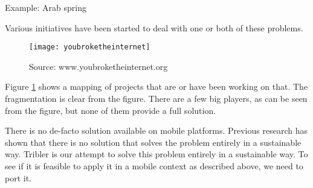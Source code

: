 Example: Arab spring \cite{Johan_2001}


Various initiatives have been started to deal with one or both of these problems. \cite{re_decentralize}

\begin{figure}[h]
	\centering
	\texttt{[image: youbroketheinternet]}
	\caption{Source: www.youbroketheinternet.org}
	\label{fig:youbroketheinternet}
\end{figure}

Figure \ref{fig:youbroketheinternet} shows a mapping of projects that are or have been working on that.
The fragmentation is clear from the figure.
There are a few big players, as can be seen from the figure, but none of them provide a full solution.






There is no de-facto solution available on mobile platforms. \cite{literature_survey}
Previous research has shown that there is no solution that solves the problem entirely in a sustainable way.
Tribler is our attempt to solve this problem entirely in a sustainable way.
To see if it is feasible to apply it in a mobile context as described above, we need to port it.

